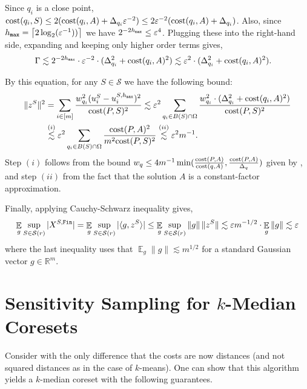\documentclass[11pt]{article}
\theoremstyle{restate}
\theoremstyle{definition}
\newcommand{\eps}{\ensuremath{\varepsilon}}
\newcommand{\R}{\ensuremath{\mathbb{R}}}
\newcommand{\norm}[1]{\ensuremath{\|#1\|}}
\newcommand{\ceil}[1]{{\left\lceil{#1}\right\rceil}}
\newcommand{\E}{\mathop{\mathbb{E}}}
\newcommand{\cost}{\textnormal{cost}}
\newcommand{\uq}[2]{u^{#1}_{#2}} %
\newcommand{\fin}{\ensuremath{\textnormal{\texttt{Fin}}}}
\newcommand{\csize}{m}
\newcommand{\inSR}{\in \mathcal{S}(r)}
\newcommand{\hmax}{h_\ensuremath{\textnormal{\texttt{max}}}}
\begin{document}
Since $q_i$ is a close point, $\cost(q_i,S) \leq 2(\cost(q_i,A) + \Delta_{q_i} \eps^{-2}) \leq 2\eps^{-2} (\cost(q_i,A) + \Delta_{q_i})$. Also, since $\hmax = \ceil{2 \log_2(\eps^{-1}))}$ we have $2^{-2\hmax} \leq \eps^{4}$. Plugging these into the right-hand side, 
expanding and keeping only higher order terms gives,
\begin{align*}
    \Gamma &\lesssim 2^{-2\hmax} \cdot \eps^{-2} \cdot  ( \Delta_{q_i}^2  +  \cost(q_i,A)^2 ) \lesssim \eps^{2} \cdot  ( \Delta_{q_i}^2  +  \cost(q_i,A)^2 ) .
\end{align*}


\noindent By this equation,  
for any $S \in \mathcal S$ we have the following bound:
    \begin{align*}
        \norm{z^S}^2 &= \sum_{i \in [m]}  \frac{w_{q_i}^2 (\uq{S}{i} - \uq{S,\hmax}{i})^2}{\cost(P,S)^2}
        \lesssim  \eps^{2}  \sum_{q_i \in B(S) \cap \Omega}\frac{ w_{q_i}^2 \cdot    ( \Delta_{q_i}^2  +  \cost({q_i},A)^2 )}{\cost(P,S)^2}\\
        &\overset{(i)}{\lesssim} \eps^{2}   \sum_{{q_i} \in B(S) \cap \Omega}\frac{ \cost(P,A)^2}{\csize^2 \cost(P,S)^2}  \overset{(ii)}{\lesssim} \eps^{2} \csize^{-1}.
    \end{align*}
    Step $(i)$ follows from the bound $w_q \leq 4\csize^{-1} \min(\tfrac{\cost(P,A)}{\cost(q,A)}, \tfrac{\cost(P, A)}{\Delta_q})$ given by , and step $(ii)$ from the fact that the solution $A$ is a constant-factor approximation.

    
    \noindent Finally, applying Cauchy-Schwarz inequality gives, 
    \begin{align*}
    \E_{g} \sup_{S\inSR}|X^{S,\fin}| =\E_{g} \sup_{S\inSR} |\langle g, z^S \rangle|  \leq \E_{g} \sup_{S\inSR} \norm{g} \, \norm{z^S} \lesssim  \eps m^{-1/2} 
 \cdot \E_{g}  \norm{g} \lesssim \eps
    \end{align*}
    where the last inequality uses that $\E_{g}  \norm{g} \lesssim m^{1/2}$ for a standard Gaussian vector $g \in \R^m$.







\section{\texorpdfstring{Sensitivity Sampling for $k$-Median Coresets}{Sensitivity Sampling for k-Median Coresets}}\label{sec: kmedian-coreset}
Consider  with the only difference that the costs are now distances (and not squared distances as in the case of $k$-means). One can show that this algorithm yields a $k$-median coreset with the following guarantees.
\end{document}
